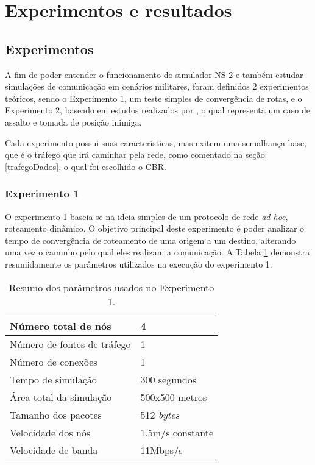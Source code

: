 \section{Experimentos e resultados}
\subsection{Experimentos}
A fim de poder entender o funcionamento do simulador NS-2 e tamb\'em estudar simula\c{c}\~oes de comunica\c{c}\~ao em cen\'arios militares, foram definidos 2 experimentos te\'oricos, sendo o Experimento 1, um teste simples de converg\^encia de rotas, e o Experimento 2, baseado em estudos realizados por \cite{pereira}, o qual representa um caso de assalto e tomada de posi\c{c}\~ao inimiga.

Cada experimento possui suas caracter\'isticas, mas exitem uma semalhan\c{c}a base, que \'e o tr\'afego que ir\'a caminhar pela rede, como comentado na se\c{c}\~ao \ref{trafegoDados}, o qual foi escolhido o CBR.

\subsubsection{Experimento 1}
O experimento 1 baseia-se na ideia simples de um protocolo de rede \textit{ad hoc}, roteamento din\^amico.
O objetivo principal deste experimento \'e poder analizar o tempo de converg\^encia de roteamento de uma origem a um destino, alterando uma vez o caminho pelo qual eles realizam a comunica\c{c}\~ao.
A Tabela \ref{tabParamExp1} demonstra resumidamente os par\^ametros utilizados na execu\c{c}\~ao do experimento 1.

\begin{table}[H]
	\centering
	\caption{Resumo dos par\^ametros usados no Experimento 1.}
	\begin{tabular}{ | l | l | }
		\hline
		N\'umero total de n\'os & 4 \\ \hline
		N\'umero de fontes de tr\'afego & 1 \\ \hline
		N\'umero de conex\~oes & 1 \\ \hline
		Tempo de simula\c{c}\~ao & 300 segundos \\ \hline
		\'Area total da simula\c{c}\~ao & 500x500 metros \\ \hline
		Tamanho dos pacotes & 512 \textit{bytes} \\ \hline	
		Velocidade dos n\'os & 1.5m/s constante \\ \hline
		Velocidade de banda & 11Mbps/s \\ \hline
	\end{tabular}
	\label{tabParamExp1}
\end{table}

